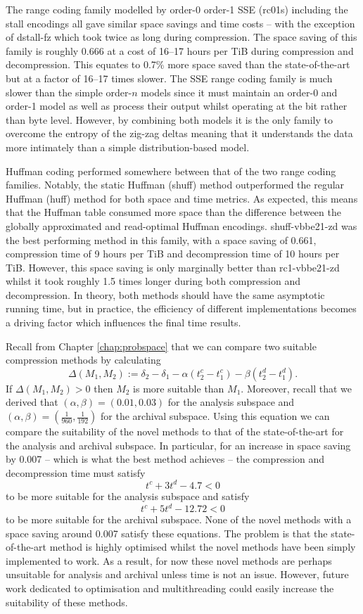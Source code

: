 The range coding family modelled by order-0 order-1 SSE (rc01s) including the stall
encodings all gave similar space savings and time costs -- with
the exception of dstall-fz which took twice as long during compression. The
space saving of this family is roughly 0.666 at a cost of 16--17 hours per TiB
during compression and decompression. This equates to 0.7\% more space saved
than the state-of-the-art but at a factor of 16--17 times slower.
The SSE range coding family is much slower than the simple order-$n$ models
since it must maintain an order-0 and order-1 model as well as process their
output whilst operating at the bit rather than byte level. However, by combining
both models it is the only family to overcome the entropy of the zig-zag deltas
meaning that it understands the data more intimately than a simple
distribution-based model.

Huffman coding performed somewhere between that of the two range coding
families. Notably, the static Huffman (shuff) method outperformed the regular
Huffman (huff) method for both space and time metrics. As expected, this means
that the Huffman table consumed more space than the difference between
the globally approximated and read-optimal Huffman encodings. shuff-vbbe21-zd
was the best performing method in this family, with a space saving of 0.661,
compression time of 9 hours per TiB and decompression time of 10 hours per TiB.
However, this space saving is only marginally better than rc1-vbbe21-zd whilst it
took roughly 1.5 times longer during both compression and decompression. In
theory, both methods should have the same asymptotic running time, but in
practice, the efficiency of different implementations becomes a driving factor
which influences the final time results.

Recall from Chapter \ref{chap:probspace} that we can compare two suitable
compression methods by calculating
\[\Delta(M_1,M_2):=\delta_2-\delta_1 - \alpha(t^c_2-t^c_1) - \beta(t^d_2-t^d_1).\]
If $\Delta(M_1,M_2)>0$ then $M_2$ is more suitable than $M_1$. Moreover, recall
that we derived that $(\alpha,\beta)=(0.01,0.03)$ for the analysis subspace and
$(\alpha,\beta)=(\frac{1}{960},\frac{1}{192})$ for the archival subspace. Using
this equation we can compare the suitability of the novel methods to that of the
state-of-the-art for the analysis and archival subspace. In particular, for an
increase in space saving
by 0.007 -- which is what the best method achieves -- the compression and
decompression time must satisfy
\[ t^c+3t^d-4.7<0 \]
to be more suitable for the analysis subspace and satisfy
\[ t^c+5t^d-12.72<0 \]
to be more suitable for the archival subspace. None of the novel methods with a
space saving around 0.007 satisfy these equations. The problem is that the
state-of-the-art method is highly optimised whilst the novel methods have been
simply implemented to work. As a result, for now these novel methods are perhaps
unsuitable for analysis and archival unless time is not an issue. However,
future work dedicated to optimisation and multithreading could easily increase
the suitability of these methods.

